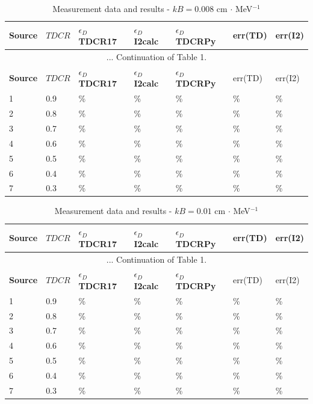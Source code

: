 \documentclass[12pt]{iopart}
\begin{document}
\begingroup
\footnotesize
\begin{longtable}[l]{| p{} | p{} |p{} |p{} |p{} |p{} |p{} |} 
\caption{Measurement data and results - $kB = 0.008$ cm $\cdot$ MeV$^{-1}$}
\label{Table1} \\ 
\hline
\textbf{Source} & \textbf{$TDCR$} & \textbf{$\epsilon_{D}$ TDCR17} & \textbf{$\epsilon_{D}$ I2calc} & \textbf{$\epsilon_{D}$ TDCRPy} & err(TD)& err(I2) \\
\endfirsthead
\multicolumn{7}{c}{... Continuation of Table 1.}\\ 
\hline
 \textbf{Source} & \textbf{$TDCR$} & \textbf{$\epsilon_{D}$ TDCR17} & \textbf{$\epsilon_{D}$ I2calc} & \textbf{$\epsilon_{D}$ TDCRPy} & err(TD)& err(I2) \\   \hline 
\endhead
\hline
 1 & 0.9   &    \% & \% &  \% &   \% &   \%\\
 2 & 0.8   &    \% & \% &  \% &   \% &   \%\\
 3 & 0.7   &    \% & \% &  \% &   \% &   \%\\
 4 & 0.6   &    \% & \% &  \% &   \% &   \%\\
 5 & 0.5   &    \% & \% &  \% &   \% &   \%\\
 6 & 0.4   &    \% & \% &  \% &   \% &   \%\\
 7 & 0.3   &    \% & \% &  \% &   \% &   \%\\
\hline
\end{longtable} 
\endgroup


\begingroup
\footnotesize
\begin{longtable}[l]{| p{} | p{} |p{} | p{} |p{} |p{} |p{} |} 
\caption{Measurement data and results - $kB = 0.01$ cm $\cdot$ MeV$^{-1}$}
\label{Table1} \\ 
\hline
\textbf{Source} & \textbf{$TDCR$} & \textbf{$\epsilon_{D}$ TDCR17} & \textbf{$\epsilon_{D}$ I2calc} & \textbf{$\epsilon_{D}$ TDCRPy} & err(TD)& err(I2) \\ 
\endfirsthead
\multicolumn{7}{c}{... Continuation of Table 1.}\\ 
\hline
 \textbf{Source} & \textbf{$TDCR$} & \textbf{$\epsilon_{D}$ TDCR17} & \textbf{$\epsilon_{D}$ I2calc} & \textbf{$\epsilon_{D}$ TDCRPy} & err(TD)& err(I2) \\   \hline 
\endhead
\hline
 1 & 0.9   &    \% & \% &  \% &   \% &   \%\\
 2 & 0.8   &    \% & \% &  \% &   \% &   \%\\
 3 & 0.7   &    \% & \% &  \% &   \% &   \%\\
 4 & 0.6   &    \% & \% &  \% &   \% &   \%\\
 5 & 0.5   &    \% & \% &  \% &   \% &   \%\\
 6 & 0.4   &    \% & \% &  \% &   \% &   \%\\
 7 & 0.3   &    \% & \% &  \% &   \% &   \%\\
\hline
\end{longtable} 
\endgroup
\end{document}
